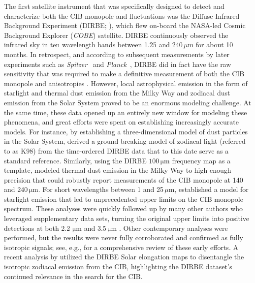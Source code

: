 \documentclass{aa}
\def\Planck{\textit{Planck}}
\def\Spitzer{\textit{Spitzer}}
\def\Planck{\textit{Planck}}
\def\COBE{\textit{COBE}}
\begin{document}
The first satellite instrument that was specifically designed to detect and characterize both the CIB monopole and fluctuations was the Diffuse Infrared Background Experiment (DIRBE; \citealp{hauser1998}), which flew on-board the NASA-led Cosmic Background Explorer (\COBE) satellite. DIRBE continuously observed the infrared sky in ten wavelength bands between 1.25 and 240\,$\mu\mathrm{m}$ for about 10 months. In retrospect, and according to subsequent measurements by later experiments such as \Spitzer\ \citep{dole:2006} and \Planck\ \citep[e.g.,][]{planck2013-pip56,planck2016-XLVIII}, DIRBE did in fact have the raw sensitivity that was required to make a definitive measurement of both the CIB monopole and anisotropies \citep{boggess92,hauser1998}. However, local astrophysical emission in the form of starlight and thermal dust emission from the Milky Way and zodiacal dust emission from the Solar System proved to be an enormous modeling challenge. At the same time, these data opened up an entirely new window for modeling these phenomena, and great efforts were spent on establishing increasingly accurate models. For instance, by establishing a three-dimensional model of dust particles in the Solar System, \citet{kelsall1998} derived a ground-breaking model of zodiacal light (referred to as K98) from the time-ordered DIRBE data that to this date serve as a standard reference. Similarly, using the DIRBE $100\,\mathrm{\mu m}$ frequency map as a template, \citet{arendt1998} modeled thermal dust emission in the Milky Way to high enough precision that \citet{hauser1998} could robustly report measurements of the CIB monopole at 140 and $240\,\mathrm{\mu m}$. For short wavelengths between 1 and 25$\,\mu\mathrm{m}$, \citet{arendt1998} established a model for starlight emission that led to unprecedented upper limits on the CIB monopole spectrum. These analyses were quickly followed up by many other authors who leveraged supplementary data sets, turning the original upper limits into positive detections at both 2.2 $\mathrm{\mu m}$ \citep{wright:2000,gorjian:2000,wright:2001} and $3.5\,\mathrm{\mu m}$ \citep{dwek:1998b,gorjian:2000,wright:2000}. Other contemporary analyses were performed, but the results were never fully corroborated and confirmed as fully isotropic signals; see, e.g., \citet{hauser:2001} for a comprehensive review of these early efforts. A recent analysis by \citet{sano:2020} utilized the DIRBE Solar elongation maps to disentangle the isotropic zodiacal emission from the CIB, highlighting the DIRBE dataset's continued relevance in the search for the CIB.
\end{document}
